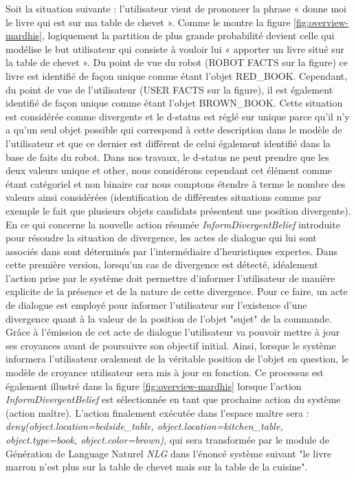 \documentclass[a4paper,11pt,twoside]{StyleThese}
\begin{document}
Soit la situation suivante :
l’utilisateur vient de prononcer la phrase « donne moi le livre qui est sur ma table de
chevet ». Comme le montre la figure \ref{fig:overview-mardhis}, logiquement la partition de plus grande probabilité devient celle qui modélise le but utilisateur qui consiste à vouloir lui « apporter
un livre situé sur la table de chevet ». Du point de vue du robot (ROBOT FACTS sur
la figure) ce livre est identifié de façon unique comme étant l’objet RED\_BOOK. Cependant,
du point de vue de l’utilisateur (USER FACTS sur la figure), il est également identifié
de façon unique comme étant l’objet BROWN\_BOOK. Cette situation est considérée
comme divergente et le d-status est réglé sur unique parce qu’il n’y a qu’un seul objet possible qui correspond à cette description dans le modèle de l’utilisateur et que ce dernier est différent de celui également identifié dans la base de faits  du robot. Dans nos travaux, le d-status ne peut prendre que les deux valeurs unique et
other, nous considérons cependant cet élément comme étant catégoriel et non binaire
car nous comptons étendre à terme le nombre des valeurs ainsi considérées (identification de différentes situations comme par exemple le fait que plusieurs objets candidats
présentent une position divergente).
En ce qui concerne la nouvelle action résumée \textit{InformDivergentBelief} introduite pour
résoudre la situation de divergence, les actes de dialogue qui lui sont associés dans sont déterminés par l’intermédiaire d’heuristiques expertes. Dans cette
première version, lorsqu’un cas de divergence est détecté, idéalement l’action prise par le système doit permettre d’informer l’utilisateur de manière explicite de la présence et de la nature de cette divergence.
Pour ce faire, un acte de dialogue est employé pour informer l’utilisateur sur l’existence d’une divergence quant à la valeur de la position de l’objet "sujet"
de la commande. Grâce à l’émission de cet acte de dialogue l’utilisateur va pouvoir
mettre à jour ses croyances avant de poursuivre son objectif initial. Ainsi, lorsque le
système informera l’utilisateur oralement de la véritable position de l’objet en question, le modèle de croyance utilisateur sera mis à jour en fonction. Ce processus est également illustré dans la figure \ref{fig:overview-mardhis} lorsque l’action \textit{InformDivergentBelief} est sélectionnée
en tant que prochaine action du système (action maître). L’action finalement exécutée
dans l’espace maître sera : \textit{deny(object.location=bedside\_table, object.location=kitchen\_table,
object.type=book, object.color=brown)}, qui sera transformée par le module de Génération de Language Naturel \textit{NLG} dans l’énoncé système suivant "le livre marron n’est plus sur la table de chevet mais sur la table de la cuisine".
\end{document}
